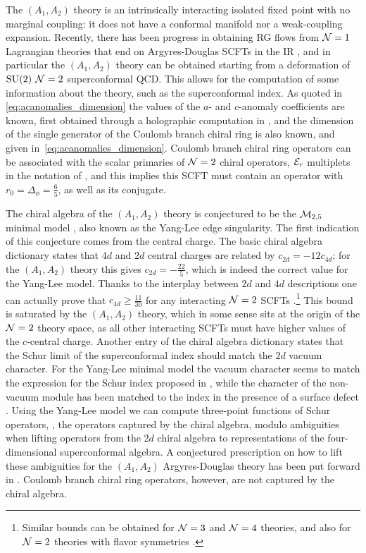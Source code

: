 The $(A_1,A_2)$ theory is an intrinsically interacting isolated fixed point with no marginal coupling: it does not have a conformal manifold nor a weak-coupling expansion. Recently, there has been progress in obtaining RG flows from ${\mathcal{N}}=1$ Lagrangian theories that end on Argyres-Douglas SCFTs in the IR \cite{Maruyoshi:2016aim,Maruyoshi:2016tqk,Agarwal:2016pjo,Agarwal:2017roi,Benvenuti:2017bpg}, and in particular the $(A_1,A_2)$ theory can be obtained starting from a deformation of $\mathrm{SU}(2)$  ${\mathcal{N}}=2$ superconformal QCD. This allows for the computation of some information about the theory, such as the superconformal index. 
As quoted in \eqref{eq:acanomalies_dimension} the values of the $a$- and $c$-anomaly coefficients are known, first obtained through a holographic computation in \cite{Aharony:2016kai},
and the dimension of the single generator of the Coulomb branch chiral ring is also known, and given in~\eqref{eq:acanomalies_dimension}.
Coulomb branch chiral ring operators can be associated with the scalar primaries of ${\mathcal{N}}=2$ chiral operators, ${\mathcal{E}}_{r}$ multiplets in the notation of \cite{Dolan:2002zh}, and this implies this SCFT must contain an operator  with $r_0=\Delta_{\phi}=\frac65$, as well as its conjugate.


The chiral algebra of the $(A_1,A_2)$ theory is conjectured to be the ${\mathcal{M}}_{2,5}$ minimal model \cite{rastelli_harvard,Beem:2017ooy}, also known as the Yang-Lee edge singularity.
The first indication of this conjecture comes from the central charge. The basic chiral algebra dictionary states that $4d$ and $2d$ central charges are related by $c_{2d} = -12c_{4d}$; for the $(A_1,A_2)$ theory this gives $c_{2d} = -\frac{22}{5}$, which is indeed the correct value for the Yang-Lee model. 
Thanks to the interplay between $2d$ and $4d$ descriptions one can actually prove that $c_{4d} \geqslant \frac{11}{30}$ for any interacting ${\mathcal{N}}=2$ SCFTs \cite{Liendo:2015ofa}.\footnote{Similar bounds can be obtained for ${\mathcal{N}}=3$ \cite{Cornagliotto:2017dup} and ${\mathcal{N}}=4$ \cite{Beem:2013qxa,Beem:2016wfs} theories, and also for ${\mathcal{N}}=2$ theories with flavor symmetries  \cite{Beem:2013sza,Lemos:2015orc,Beem:2017ooy}.} This bound is saturated by the  $(A_1,A_2)$ theory, which in some sense sits at the origin of the ${\mathcal{N}}=2$ theory space, as all other interacting SCFTs must have higher values of the $c$-central charge.
Another entry of the chiral algebra dictionary states that the Schur limit of the superconformal index \cite{Kinney:2005ej,Gadde:2011uv,Rastelli:2014jja} should match the $2d$ vacuum character. For the Yang-Lee minimal model the vacuum character seems to match the expression for the Schur index proposed in \cite{Cordova:2015nma}, while the character of the non-vacuum module has been matched to the index in the presence of a surface defect \cite{Cordova:2017mhb}.
Using the Yang-Lee model we can compute three-point functions of Schur operators, \ie, the operators captured by the chiral algebra,
modulo ambiguities when lifting operators from the $2d$ chiral algebra to representations of the four-dimensional superconformal algebra. A conjectured prescription on how to lift these ambiguities for the $(A_1,A_2)$ Argyres-Douglas theory has been put forward in \cite{Song:2016yfd}. Coulomb branch chiral ring operators, however, are not captured by the chiral algebra.


